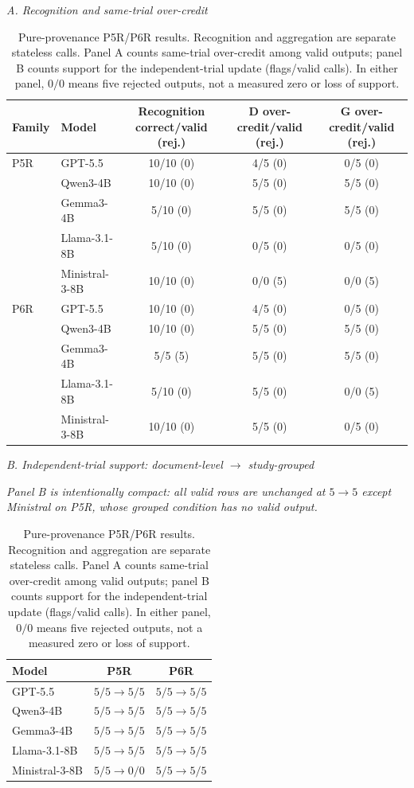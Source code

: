 \documentclass[11pt]{article}
\begin{document}
\begin{table}[t]
\centering
\small
\textit{A. Recognition and same-trial over-credit}\par\smallskip
\begin{tabular}{@{}llccc@{}}
\toprule
Family & Model & Recognition correct/valid (rej.) & D over-credit/valid (rej.) & G over-credit/valid (rej.) \\
\midrule
P5R & GPT-5.5 & 10/10 (0) & 4/5 (0) & 0/5 (0) \\
    & Qwen3-4B & 10/10 (0) & 5/5 (0) & 5/5 (0) \\
    & Gemma3-4B & 5/10 (0) & 5/5 (0) & 5/5 (0) \\
    & Llama-3.1-8B & 5/10 (0) & 0/5 (0) & 0/5 (0) \\
    & Ministral-3-8B & 10/10 (0) & 0/0 (5) & 0/0 (5) \\
\addlinespace[2pt]
P6R & GPT-5.5 & 10/10 (0) & 4/5 (0) & 0/5 (0) \\
    & Qwen3-4B & 10/10 (0) & 5/5 (0) & 5/5 (0) \\
    & Gemma3-4B & 5/5 (5) & 5/5 (0) & 5/5 (0) \\
    & Llama-3.1-8B & 5/10 (0) & 5/5 (0) & 0/0 (5) \\
    & Ministral-3-8B & 10/10 (0) & 5/5 (0) & 0/5 (0) \\
\bottomrule
\end{tabular}
\par\medskip
\textit{B. Independent-trial support: document-level $\to$ study-grouped}\par\smallskip
\noindent\emph{Panel B is intentionally compact: all valid rows are unchanged at $5\to5$ except Ministral on P5R, whose grouped condition has no valid output.}\par\smallskip
\begin{tabular}{@{}lcc@{}}
\toprule
Model & P5R & P6R \\
\midrule
GPT-5.5 & $5/5\to5/5$ & $5/5\to5/5$ \\
Qwen3-4B & $5/5\to5/5$ & $5/5\to5/5$ \\
Gemma3-4B & $5/5\to5/5$ & $5/5\to5/5$ \\
Llama-3.1-8B & $5/5\to5/5$ & $5/5\to5/5$ \\
Ministral-3-8B & $5/5\to0/0$ & $5/5\to5/5$ \\
\bottomrule
\end{tabular}
\caption{Pure-provenance P5R/P6R results. Recognition and aggregation are separate stateless calls. Panel A counts same-trial over-credit among valid outputs; panel B counts support for the independent-trial update (flags/valid calls). In either panel, $0/0$ means five rejected outputs, not a measured zero or loss of support.}
\label{tab:later-detail}
\end{table}
\end{document}
